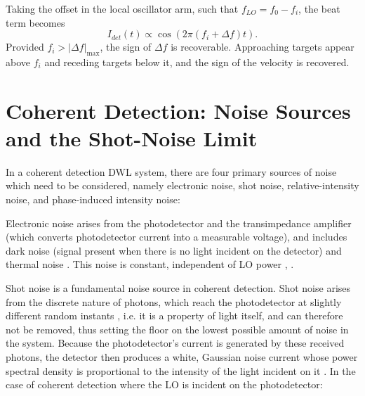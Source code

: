     Taking the offset in the local oscillator arm, such
    that $f_{LO} = f_0 - f_i$, the beat term becomes
    \begin{equation}
        I_{det}(t) \propto \cos\!\left( 2\pi \left( f_i + \Delta f \right) t \right).
        \label{eq:heterodyne_beat}
    \end{equation}
    Provided $f_i > \lvert \Delta f \rvert_{\max}$, the sign of $\Delta f$ is recoverable. Approaching targets appear above $f_i$ and receding targets below it, and the sign of the velocity is recovered.

    \section{Coherent Detection: Noise Sources and the Shot-Noise Limit}
    \label{sec:lit-noiseSources}
    In a coherent detection DWL system, there are four primary sources of noise which need to be considered, namely electronic noise, shot noise, relative-intensity noise, and phase-induced intensity noise:

    Electronic noise arises from the photodetector and the transimpedance amplifier (which converts photodetector current into a measurable voltage), and includes dark noise (signal present when there is no light incident on the detector) and thermal noise \cite{hill_remote_nodate}. This noise is constant, independent of LO power \cite{cariou_leosphere_nodate}, \cite{abdelazim_development_2015}. 

    Shot noise is a fundamental noise source in coherent detection. Shot noise arises from the discrete nature of photons, which reach the photodetector at slightly different random instants \cite{paschotta_shot_noise}, i.e. it is a property of light itself, and can therefore not be removed, thus setting the floor on the lowest possible amount of noise in the system.  Because
    the photodetector's current is generated by these received photons, the detector then produces a white, Gaussian noise current whose power spectral density is
    proportional to the intensity of the light incident on it \cite{paschotta_shot_noise}. In the case of coherent detection where the LO is incident on the photodetector:
    
